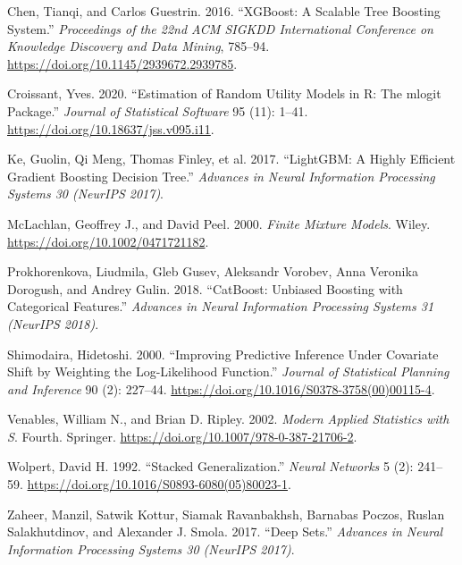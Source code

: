\documentclass[
  9.5pt,
]{article}
\newlength{\cslhangindent}
\newenvironment{CSLReferences}[2] %
 {\begin{list}{}{%
  \setlength{\itemindent}{0pt}
  \setlength{\leftmargin}{0pt}
  \setlength{\parsep}{0pt}
  \ifodd #1
   \setlength{\leftmargin}{\cslhangindent}
   \setlength{\itemindent}{-1\cslhangindent}
  \fi
  \setlength{\itemsep}{#2\baselineskip}}}
 {\end{list}}
\begin{document}
\protect{}\label{refs}
\begin{CSLReferences}{1}{1}
Chen, Tianqi, and Carlos Guestrin. 2016. {``{XGBoost}: A Scalable Tree
Boosting System.''} \emph{Proceedings of the 22nd ACM SIGKDD
International Conference on Knowledge Discovery and Data Mining},
785--94. \url{https://doi.org/10.1145/2939672.2939785}.

Croissant, Yves. 2020. {``Estimation of Random Utility Models in {R}:
The {mlogit} Package.''} \emph{Journal of Statistical Software} 95 (11):
1--41. \url{https://doi.org/10.18637/jss.v095.i11}.

Ke, Guolin, Qi Meng, Thomas Finley, et al. 2017. {``{LightGBM}: A Highly
Efficient Gradient Boosting Decision Tree.''} \emph{Advances in Neural
Information Processing Systems 30 (NeurIPS 2017)}.

McLachlan, Geoffrey J., and David Peel. 2000. \emph{Finite Mixture
Models}. Wiley. \url{https://doi.org/10.1002/0471721182}.

Prokhorenkova, Liudmila, Gleb Gusev, Aleksandr Vorobev, Anna Veronika
Dorogush, and Andrey Gulin. 2018. {``{CatBoost}: Unbiased Boosting with
Categorical Features.''} \emph{Advances in Neural Information Processing
Systems 31 (NeurIPS 2018)}.

Shimodaira, Hidetoshi. 2000. {``Improving Predictive Inference Under
Covariate Shift by Weighting the Log-Likelihood Function.''}
\emph{Journal of Statistical Planning and Inference} 90 (2): 227--44.
\url{https://doi.org/10.1016/S0378-3758(00)00115-4}.

Venables, William N., and Brian D. Ripley. 2002. \emph{Modern Applied
Statistics with {S}}. Fourth. Springer.
\url{https://doi.org/10.1007/978-0-387-21706-2}.

Wolpert, David H. 1992. {``Stacked Generalization.''} \emph{Neural
Networks} 5 (2): 241--59.
\url{https://doi.org/10.1016/S0893-6080(05)80023-1}.

Zaheer, Manzil, Satwik Kottur, Siamak Ravanbakhsh, Barnabas Poczos,
Ruslan Salakhutdinov, and Alexander J. Smola. 2017. {``Deep Sets.''}
\emph{Advances in Neural Information Processing Systems 30 (NeurIPS
2017)}.

\end{CSLReferences}
\end{document}
